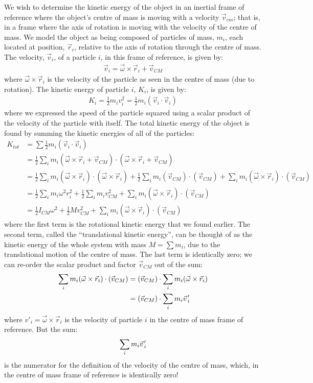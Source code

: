 We wish to determine the kinetic energy of the object in an inertial frame of reference where the object's centre of mass is moving with a velocity $\vec v_{cm}$; that is, in a frame where the axis of rotation is moving with the velocity of the centre of mass. We model the object as being composed of particles of mass, $m_i$, each located at position, $\vec r_i$, relative to the axis of rotation through the centre of mass. The velocity, $\vec v_i$, of a particle $i$, in this frame of reference, is given by:
\begin{align*}
\vec v_i = \vec\omega \times \vec r_i + \vec v_{CM}
\end{align*}
where $\vec\omega \times \vec r_i$ is the velocity of the particle as seen in the centre of mass (due to rotation). The kinetic energy of particle $i$, $K_i$, is given by:
\begin{align*}
K_i = \frac{1}{2}m_iv_i^2 = \frac{1}{2}m_i(\vec v_i\cdot \vec v_i)
\end{align*}
where we expressed the speed of the particle squared using a scalar product of the velocity of the particle with itself. The total kinetic energy of the object is found by summing the kinetic energies of all of the particles:
\begin{align*}
K_{tot} &= \sum \frac{1}{2}m_i(\vec v_i\cdot \vec v_i) \\
&=\frac{1}{2} \sum_i m_i (\vec\omega \times \vec r_i + \vec v_{CM}) \cdot (\vec\omega \times \vec r_i + \vec v_{CM})\\
&=\frac{1}{2} \sum_i m_i (\vec\omega \times \vec r_i)\cdot(\vec\omega \times \vec r_i ) + \frac{1}{2} \sum_i m_i (\vec v_{CM}) \cdot (\vec v_{CM}) + \sum_i m_i (\vec\omega \times \vec r_i) \cdot (\vec v_{CM})\\
&=\frac{1}{2}  \sum_i m_i \omega^2r_i^2 + \frac{1}{2} \sum_i m_i v_{CM}^2 + \sum_i m_i (\vec\omega \times \vec r_i) \cdot (\vec v_{CM})\\
&=\frac{1}{2} I_{CM}\omega ^2 + \frac{1}{2}M v_{CM}^2+\sum_i m_i (\vec\omega \times \vec r_i) \cdot (\vec v_{CM})
\end{align*} 
where the first term is the rotational kinetic energy that we found earlier. The second term, called the ``translational kinetic energy'', can be thought of as the kinetic energy of the whole system with mass $M=\sum m_i$, due to the translational motion of the centre of mass. The last term is identically zero; we can re-order the scalar product and factor $\vec v_{CM}$ out of the sum:
\begin{align*}
\sum_i m_i (\vec\omega \times \vec r_i) \cdot (\vec v_{CM}) &= (\vec v_{CM}) \cdot \sum_i m_i (\vec\omega \times \vec r_i)\\
&=(\vec v_{CM}) \cdot \sum_i m_i \pvec v'_{i}
\end{align*}
where $v'_{i} = \vec\omega \times \vec r_i$ is the velocity of particle $i$ in the centre of mass frame of reference. But the sum:
\begin{align*}
\sum_i m_i \pvec v'_{i}
\end{align*}
is the numerator for the definition of the velocity of the centre of mass, which, in the centre of mass frame of reference is identically zero!

